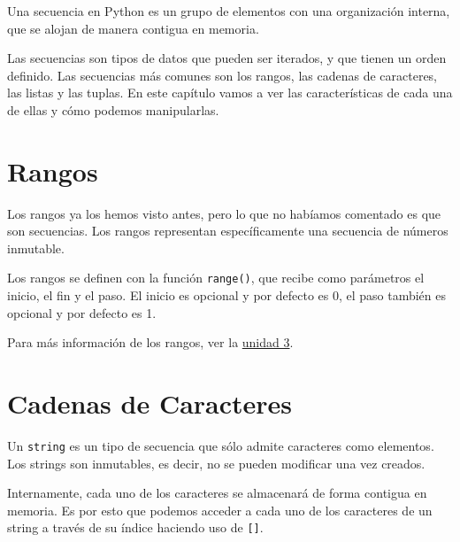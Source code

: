 \documentclass[
  letterpaper,
  DIV=11,
  numbers=noendperiod]{scrreprt}
\begin{document}
Una secuencia en Python es un grupo de elementos con una organización
interna, que se alojan de manera contigua en memoria.

Las secuencias son tipos de datos que pueden ser iterados, y que tienen
un orden definido. Las secuencias más comunes son los rangos, las
cadenas de caracteres, las listas y las tuplas. En este capítulo vamos a
ver las características de cada una de ellas y cómo podemos
manipularlas.

\section{Rangos}\label{rangos}

Los rangos ya los hemos visto antes, pero lo que no habíamos comentado
es que son secuencias. Los rangos representan específicamente una
secuencia de números inmutable.

Los rangos se definen con la función \texttt{range()}, que recibe como
parámetros el inicio, el fin y el paso. El inicio es opcional y por
defecto es 0, el paso también es opcional y por defecto es 1.

\begin{tcolorbox}[enhanced jigsaw, opacitybacktitle=0.6, toptitle=1mm, toprule=.15mm, arc=.35mm, breakable, bottomrule=.15mm, opacityback=0, leftrule=.75mm, rightrule=.15mm, title=\textcolor{quarto-callout-note-color}{\faInfo}\hspace{0.5em}{Note}, left=2mm, bottomtitle=1mm, colframe=quarto-callout-note-color-frame, colback=white, titlerule=0mm, coltitle=black, colbacktitle=quarto-callout-note-color!10!white]

Para más información de los rangos, ver la \hyperref[ciclo-for]{unidad
3}.

\end{tcolorbox}

\section{Cadenas de Caracteres}\label{cadenas-de-caracteres}

Un \texttt{string} es un tipo de secuencia que sólo admite caracteres
como elementos. Los strings son inmutables, es decir, no se pueden
modificar una vez creados.

Internamente, cada uno de los caracteres se almacenará de forma contigua
en memoria. Es por esto que podemos acceder a cada uno de los caracteres
de un string a través de su índice haciendo uso de \texttt{{[}{]}}.
\end{document}
